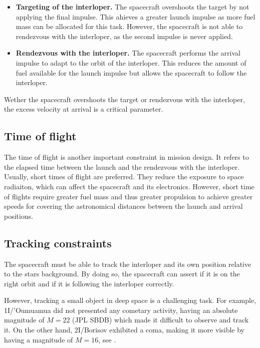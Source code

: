 \begin{itemize}

  \item \textbf{Targeting of the interloper.} The spacecraft overshoots the target by
        not applying the final impulse. This ahieves a greater launch
        impulse as more fuel mass can be allocated for this task. However, the
        spacecraft is not able to rendezvous with the interloper, as the second
        impulse is never applied.

  \item \textbf{Rendezvous with the interloper.} The spacecraft performs the
        arrival impulse to adapt to the orbit of the interloper. This reduces the
        amount of fuel available for the launch impulse but allows the spacecraft to
        follow the interloper.

\end{itemize}

Wether the spacecraft overshoots the target or rendezvous with the interloper,
the excess velocity at arrival is a critical parameter.

\subsection{Time of flight}

The time of flight is another important constraint in mission design. It refers
to the elapsed time between the launch and the rendezvous with the interloper.
Usually, short times of flight are preferred. They reduce the exposure to space
radiaiton, which can affect the spacecraft and its electronics. However, short
time of flights require greater fuel mass and thus greater propulsion to achieve
greater speeds for covering the astronomical distances between the launch and
arrival positions.

\subsection{Tracking constraints}

The spacecraft must be able to track the interloper and its own position
relative to the stars background. By doing so, the spacecraft can assert if it
is on the right orbit and if it is following the interloper correctly.

However, tracking a small object in deep space is a challenging task. For
example, 1I/'Oumuamua did not presented any cometary activity, having an absolute
magnitude of $M = 22$ (JPL SBDB) which made it difficult to observe and track
it. On the other hand, 2I/Borisov exhibited a coma, making it more visible by
having a magnitude of $M = 16$, see \cite{jewitt2020} .
